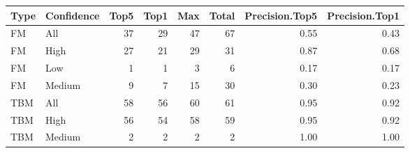 \begin{table}[ht]
\centering
\begin{tabular}{llrrrrrr}
  \hline
Type & Confidence & Top5 & Top1 & Max & Total & Precision.Top5 & Precision.Top1 \\ 
  \hline
FM & All &  37 &  29 &  47 &  67 & 0.55 & 0.43 \\ 
  FM & High &  27 &  21 &  29 &  31 & 0.87 & 0.68 \\ 
  FM & Low &   1 &   1 &   3 &   6 & 0.17 & 0.17 \\ 
  FM & Medium &   9 &   7 &  15 &  30 & 0.30 & 0.23 \\ 
  TBM & All &  58 &  56 &  60 &  61 & 0.95 & 0.92 \\ 
  TBM & High &  56 &  54 &  58 &  59 & 0.95 & 0.92 \\ 
  TBM & Medium &   2 &   2 &   2 &   2 & 1.00 & 1.00 \\ 
   \hline
\end{tabular}
\end{table}
